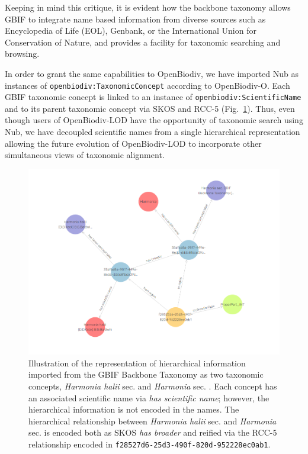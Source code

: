 Keeping in mind this critique, it is evident how the backbone taxonomy allows GBIF to integrate name based information from diverse sources such as Encyclopedia of Life (EOL), Genbank, or the International Union for Conservation of Nature, and provides a facility for taxonomic searching and browsing.

In order to grant the same capabilities to OpenBiodiv, we have imported Nub as instances of {\tt openbiodiv:TaxonomicConcept} according to OpenBiodiv-O. Each GBIF taxonomic concept is linked to an instance of {\tt openbiodiv:ScientificName} and to its parent taxonomic concept via SKOS and RCC-5 (Fig.~\ref{fig:harmonia-halii-visual}). Thus, even though users of OpenBiodiv-LOD have the opportunity of taxonomic search using Nub, we have decoupled scientific names from a single hierarchical representation allowing the future evolution of OpenBiodiv-LOD to incorporate other simultaneous views of taxonomic alignment.

\begin{figure}
\centering
\includegraphics[width=\textwidth]{Figures/harmonia-halii-visgraph}
\decoRule
\caption[Visual graph of \emph{Harmonia halii}]{Illustration of the representation of hierarchical information imported from the GBIF Backbone Taxonomy as two taxonomic concepts, \emph{Harmonia halii} sec. \cite{gbif_secretariat_gbif_2017} and \emph{Harmonia} sec. \cite{gbif_secretariat_gbif_2017}. Each concept has an associated scientific name via \emph{has scientific name}; however, the hierarchical information is not encoded in the names. The hierarchical relationship between \emph{Harmonia halii} sec. \cite{gbif_secretariat_gbif_2017} and \emph{Harmonia} sec. \cite{gbif_secretariat_gbif_2017} is encoded both as SKOS \emph{has broader} and reified via the RCC-5 relationship encoded in {\tt f28527d6-25d3-490f-820d-952228ec0ab1}.}
\label{fig:harmonia-halii-visual}
\end{figure}

